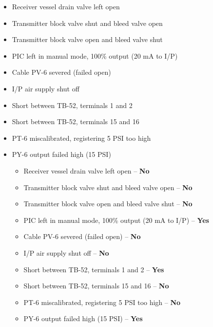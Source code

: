 \begin{itemize}
\item{} Receiver vessel drain valve left open
\item{} Transmitter block valve shut and bleed valve open
\item{} Transmitter block valve open and bleed valve shut
\item{} PIC left in manual mode, 100\% output (20 mA to I/P)
\item{} Cable PV-6 severed (failed open)
\item{} I/P air supply shut off
\item{} Short between TB-52, terminals 1 and 2
\item{} Short between TB-52, terminals 15 and 16 
\item{} PT-6 miscalibrated, registering 5 PSI too high
\item{} PY-6 output failed high (15 PSI) 

\medskip







\begin{itemize}
\item{} Receiver vessel drain valve left open -- {\bf No}
\item{} Transmitter block valve shut and bleed valve open -- {\bf No}
\item{} Transmitter block valve open and bleed valve shut -- {\bf No}
\item{} PIC left in manual mode, 100\% output (20 mA to I/P) -- {\bf Yes}
\item{} Cable PV-6 severed (failed open) -- {\bf No}
\item{} I/P air supply shut off -- {\bf No}
\item{} Short between TB-52, terminals 1 and 2 -- {\bf Yes}
\item{} Short between TB-52, terminals 15 and 16 -- {\bf No}
\item{} PT-6 miscalibrated, registering 5 PSI too high -- {\bf No}
\item{} PY-6 output failed high (15 PSI) -- {\bf Yes}
\end{itemize}









\end{itemize}
